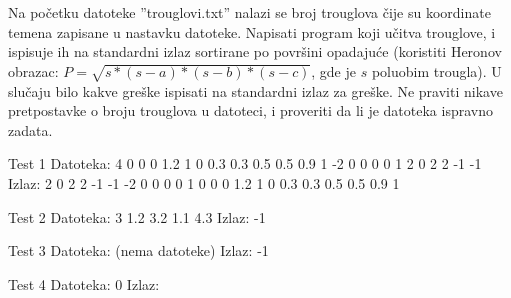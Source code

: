 \begin{Exercise}[label=905]

Na početku datoteke ''trouglovi.txt'' nalazi se broj trouglova čije su koordinate temena zapisane u nastavku datoteke. Napisati
  program koji učitva trouglove, i ispisuje ih na standardni izlaz
  sortirane po površini opadajuće (koristiti Heronov obrazac: 
  $P = \sqrt{s*(s-a)*(s-b)*(s-c)}$, gde je $s$ poluobim trougla). U slučaju bilo kakve greške ispisati  na standardni izlaz za greške. Ne praviti nikave pretpostavke o broju trouglova u datoteci, i proveriti da li je datoteka ispravno zadata.

\begin{miditest}
\begin{test}{Test 1}
Datoteka:  4                         
           0 0 0 1.2 1 0          
           0.3 0.3 0.5 0.5 0.9 1
           -2 0 0 0 0 1
           2 0 2 2 -1 -1
Izlaz:     2 0 2 2 -1 -1             
           -2 0 0 0 0 1
           0 0 0 1.2 1 0
           0.3 0.3 0.5 0.5 0.9 1                                                   
\end{test}
\end{miditest}
\begin{minitest}
\begin{test}{Test 2}
Datoteka:  3             
          1.2 3.2 1.1 4.3
Izlaz:     -1                                            
\end{test}
\end{minitest}

\begin{miditest}
\begin{test}{Test 3}
Datoteka:   (nema datoteke)
Izlaz:     -1                                            
\end{test}
\end{miditest}
\begin{minitest}
\begin{test}{Test 4}
Datoteka:   0
Izlaz:                                                 
\end{test}
\end{minitest}

\end{Exercise}

\begin{Answer}[ref=905]
\end{Answer}

